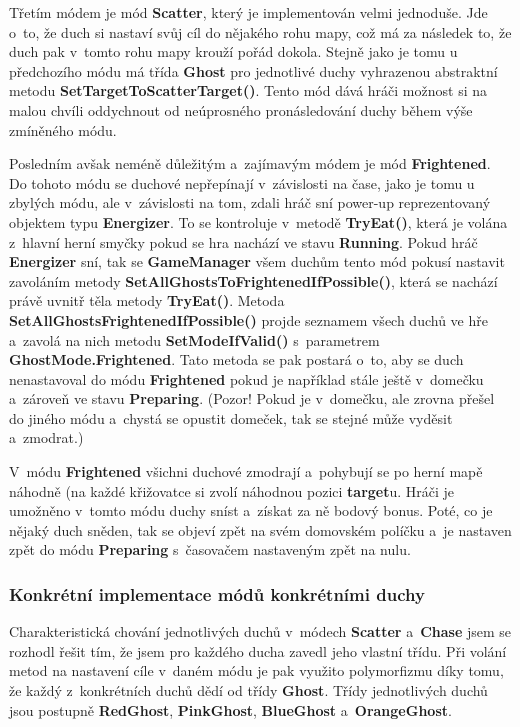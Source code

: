 \documentclass[a4]{article}
\begin{document}
Třetím módem je mód \textbf{Scatter}, který je implementován velmi jednoduše. Jde o~to, že duch si nastaví svůj cíl do nějakého rohu mapy, což má za následek to, že duch pak v~tomto rohu mapy krouží pořád dokola. Stejně jako je tomu u předchozího módu má třída \textbf{Ghost} pro jednotlivé duchy vyhrazenou abstraktní metodu \textbf{SetTargetToScatterTarget()}. Tento mód dává hráči možnost si na malou chvíli oddychnout od neúprosného pronásledování duchy během výše zmíněného módu.

Posledním avšak neméně důležitým a~zajímavým módem je mód \textbf{Frightened}. Do tohoto módu se duchové nepřepínají v~závislosti na čase, jako je tomu u zbylých módu, ale v~závislosti na tom, zdali hráč sní power-up reprezentovaný objektem typu \textbf{Energizer}. To se kontroluje v~metodě \textbf{TryEat()}, která je volána z~hlavní herní smyčky pokud se hra nachází ve stavu \textbf{Running}. Pokud hráč \textbf{Energizer} sní, tak se \textbf{GameManager} všem duchům tento mód pokusí nastavit zavoláním metody \textbf{SetAllGhostsToFrightenedIfPossible()}, která se nachází právě uvnitř těla metody \textbf{TryEat()}. Metoda \textbf{SetAllGhostsFrightenedIfPossible()} projde seznamem všech duchů ve hře a~zavolá na nich metodu \textbf{SetModeIfValid()} s~parametrem \textbf{GhostMode.Frightened}. Tato metoda se pak postará o~to, aby se duch nenastavoval do módu \textbf{Frightened} pokud je například stále ještě v~domečku a~zároveň ve stavu \textbf{Preparing}. (Pozor! Pokud je v~domečku, ale zrovna přešel do jiného módu a~chystá se opustit domeček, tak se stejné může vyděsit a~zmodrat.)

V~módu \textbf{Frightened} všichni duchové zmodrají a~pohybují se po herní mapě náhodně (na každé křižovatce si zvolí náhodnou pozici \textbf{target}u. Hráči je umožněno v~tomto módu duchy sníst a~získat za ně bodový bonus. Poté, co je nějaký duch sněden, tak se objeví zpět na svém domovském políčku a~je nastaven zpět do módu \textbf{Preparing} s~časovačem nastaveným zpět na nulu.

\subsubsection{Konkrétní implementace módů konkrétními duchy} \label{concretemodes}
Charakteristická chování jednotlivých duchů v~módech \textbf{Scatter} a~\textbf{Chase} jsem se rozhodl řešit tím, že jsem pro každého ducha zavedl jeho vlastní třídu. Při volání metod na nastavení cíle v~daném módu je pak využito polymorfizmu díky tomu, že každý z~konkrétních duchů dědí od třídy \textbf{Ghost}. Třídy jednotlivých duchů jsou postupně \textbf{RedGhost}, \textbf{PinkGhost}, \textbf{BlueGhost} a~\textbf{OrangeGhost}. 
\end{document}
